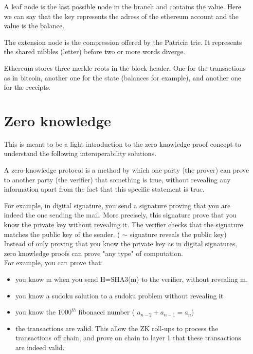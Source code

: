 A leaf node is the last possible node in the branch and contains the value. Here we can say that the key represents the adress of the ethereum account and the value is the balance. 

The extension node is the compression offered by the Patricia trie. It represents the shared nibbles (letter) before two or more words diverge. 



Ethereum\cite{Buterin..13} stores three merkle roots in the block header. One for the transactions as in bitcoin, another one for the state (balances for example), and another one for the receipts. 


\section{Zero knowledge}
\label{zeroknowledge}
This is meant to be a light introduction to the zero knowledge proof concept to understand the following interoperability solutions. 

A zero-knowledge protocol is a method by which one party (the prover) can prove to another party (the verifier) that something is true, without revealing any information apart from the fact that this specific statement is true. \cite{Goldwasser}

For example, in digital signature, you send a signature proving that you are indeed the one sending the mail. More precisely, this signature prove that you know the private key without revealing it. The verifier checks that the signature matches the public key of the sender. ( $\sim$ signature reveals the public key)
\\Instead of only proving that you know the private key as in digital signatures, zero knowledge proofs can prove "any type" of computation. 
\\For example, you can prove that: 
\begin{itemize}
    \item you know m when you send H=SHA3(m) to the verifier, without revealing m. 
    \item you know a sudoku solution to a sudoku problem without revealing it 
    \item you know the $1000^{th}$ fibonacci number ( $a_{n-2}+a_{n-1}=a_n$)
    \item the transactions are valid. This allow the ZK roll-ups to process the transactions off chain, and prove on chain to layer 1 that these transactions are indeed valid. 
\end{itemize}

